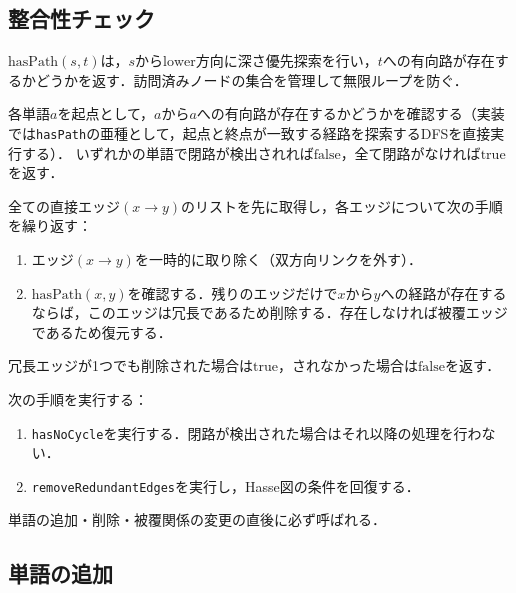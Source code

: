 \documentclass[../../main-detail.tex]{subfiles}
\begin{document}
\subsection{整合性チェック}

\begin{definition}
    $\mathrm{hasPath}(s, t)$は，$s$から$\mathrm{lower}$方向に深さ優先探索を行い，$t$への有向路が存在するかどうかを返す．訪問済みノードの集合を管理して無限ループを防ぐ．
\end{definition}

\begin{definition}
    各単語$a$を起点として，$a$から$a$への有向路が存在するかどうかを確認する（実装では\texttt{hasPath}の亜種として，起点と終点が一致する経路を探索するDFSを直接実行する）．
    いずれかの単語で閉路が検出されれば$\mathrm{false}$，全て閉路がなければ$\mathrm{true}$を返す．
\end{definition}

\begin{definition}
    全ての直接エッジ$(x \to y)$のリストを先に取得し，各エッジについて次の手順を繰り返す：
    \begin{enumerate}
        \item エッジ$(x \to y)$を一時的に取り除く（双方向リンクを外す）．
        \item $\mathrm{hasPath}(x, y)$を確認する．残りのエッジだけで$x$から$y$への経路が存在するならば，このエッジは冗長であるため削除する．存在しなければ被覆エッジであるため復元する．
    \end{enumerate}
    冗長エッジが1つでも削除された場合は$\mathrm{true}$，されなかった場合は$\mathrm{false}$を返す．
\end{definition}

\begin{definition}
    次の手順を実行する：
    \begin{enumerate}
        \item \texttt{hasNoCycle}を実行する．閉路が検出された場合はそれ以降の処理を行わない．
        \item \texttt{removeRedundantEdges}を実行し，Hasse図の条件を回復する．
    \end{enumerate}
    単語の追加・削除・被覆関係の変更の直後に必ず呼ばれる．
\end{definition}

\subsection{単語の追加}
\end{document}
